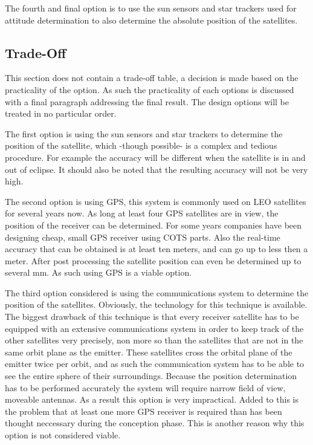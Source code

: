 The fourth and final option is to use the sun sensors and star trackers used for attitude determination to also determine the absolute position of the satellites.

\subsection{Trade-Off}
\label{navi2}
This section does not contain a trade-off table, a decision is made based on the practicality of the option. As such the practicality of each options is discussed with a final paragraph addressing the final result. The design options will be treated in no particular order.

The first option is using the sun sensors and star trackers to determine the position of the satellite, which -though possible- is a complex and tedious procedure. For example the accuracy will be different when the satellite is in and out of eclipse. It should also be noted that the resulting accuracy will not be very high.

The second option is using \acs{GPS}, this system is commonly used on \acs{LEO} satellites for several years now. As long at least four \acs{GPS} satellites are in view, the position of the receiver can be determined. For some years companies have been designing cheap, small GPS receiver using \acs{COTS} parts. Also the real-time accuracy that can be obtained is at least ten meters, and can go up to less then a meter. After post processing the satellite position can even be determined up to several mm. As such using \acs{GPS} is a viable option.

The third option considered is using the communications system to determine the position of the satellites. Obviously, the technology for this technique is available. The biggest drawback of this technique is that every receiver satellite has to be equipped with an extensive communications system in order to keep track of the other satellites very precisely, non more so than the satellites that are not in the same orbit plane as the emitter. These satellites cross the orbital plane of the emitter twice per orbit, and as such the communication system has to be able to see the entire sphere of their surroundings. Because the position determination has to be performed accurately the system will require narrow field of view, moveable antennas. As a result this option is very impractical. Added to this is the problem that at least one more \acs{GPS} receiver is required than has been thought neccessary during the conception phase. This is another reason why this option is not considered viable.

